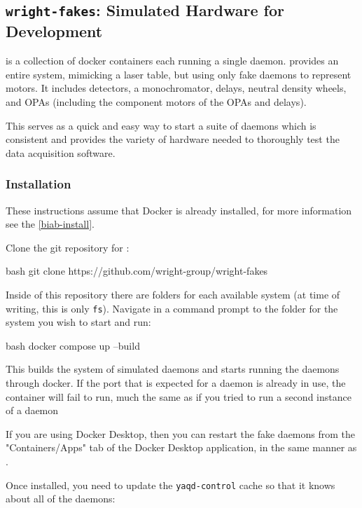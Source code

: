 \subsection{\texttt{wright-fakes}: Simulated Hardware for Development}
\label{wright-fakes}

\wrightfakes is a collection of docker containers each running a single \yaq daemon.
\wrightfakes provides an entire system, mimicking a laser table, but using only fake daemons to represent motors.
It includes detectors, a monochromator, delays, neutral density wheels, and OPAs (including the component motors of the OPAs and delays).

This serves as a quick and easy way to start a suite of \yaq daemons which is consistent and provides the variety of hardware needed to thoroughly test the data acquisition software.

\subsubsection{Installation}
These instructions assume that Docker is already installed, for more information see the \ref{biab-install}.


Clone the git repository for \wrightfakes:

\begin{codefragment}{bash}
git clone https://github.com/wright-group/wright-fakes
\end{codefragment}

Inside of this repository there are folders for each available system (at time of writing, this is only \texttt{fs}).
Navigate in a command prompt to the folder for the system you wish to start and run:

\begin{codefragment}{bash}
docker compose up --build
\end{codefragment}

This builds the system of simulated daemons and starts running the daemons through docker.
If the port that is expected for a \yaq daemon is already in use, the container will fail to run, much the same as if you tried to run a second instance of a \yaq daemon


If you are using Docker Desktop, then you can restart the fake daemons from the "Containers/Apps" tab of the Docker Desktop application, in the same manner as \biab.

Once installed, you need to update the \texttt{yaqd-control} cache so that it knows about all of the daemons:

